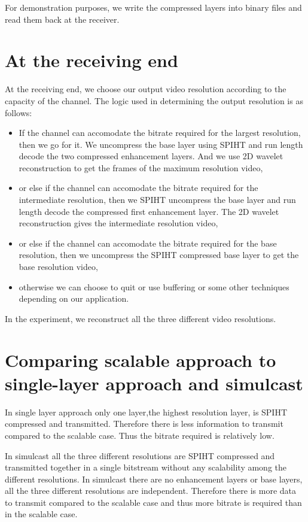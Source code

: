 \documentclass[10pt,twocolumn]{article}
\begin{document}
For demonstration purposes, we write the compressed layers into binary files and read them back at the receiver.

\section{At the receiving end}

At the receiving end, we choose our output video resolution according to the capacity of the channel. The logic used in determining the output resolution is as follows:
\begin{itemize}
    \item If the channel can accomodate the bitrate required for the largest resolution, then we go for it. We uncompress the base layer using SPIHT\cite{amirSaid1996} and run length decode the two compressed enhancement layers. And we use 2D wavelet reconstruction to get the frames of the maximum resolution video,
    \item or else if the channel can accomodate the bitrate required for the intermediate resolution, then we SPIHT uncompress the base layer and run length decode the compressed first enhancement layer. The 2D wavelet reconstruction gives the intermediate resolution video,
    \item or else if the channel can accomodate the bitrate required for the base resolution, then we uncompress the SPIHT compressed base layer to get the base resolution video,
    \item otherwise we can choose to quit or use buffering or some other techniques depending on our application.
\end{itemize}

In the experiment, we reconstruct all the three different video resolutions.


\section{Comparing scalable approach to single-layer approach and simulcast}

In single layer approach only one layer,the highest resolution layer, is SPIHT compressed and transmitted. Therefore there is less information to transmit compared to the scalable case. Thus the bitrate required is relatively low.

In simulcast all the three different resolutions are SPIHT compressed and transmitted together in a single bitstream without any scalability among the different resolutions. In simulcast there are no enhancement layers or base layers, all the three different resolutions are independent. Therefore there is more data to transmit compared to the scalable case and thus more bitrate is required than in the scalable case.
\end{document}
